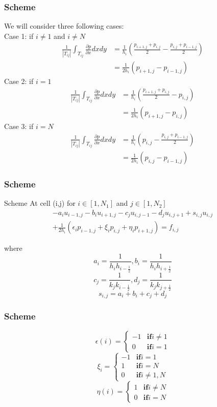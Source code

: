 \documentclass[11pt]{beamer}
\numberwithin{equation}{section}
\theoremstyle{plain}
\theoremstyle{definition}
\theoremstyle{remark}
\begin{document}
\begin{frame}\frametitle{Scheme}
We will consider three following cases: \\
Case 1: if $i \neq 1 $ and $ i \neq N $
\begin{align*}
\frac{1}{|T_{ij}|}\int_{T_{ij}} \frac{\partial p}{\partial x}dxdy &= \frac{1}{h_{i}}\left(\frac{p_{i+1,j}+p_{i,j}}{2}-\frac{p_{i,j}+p_{i-1,j}}{2}\right) \\
& = \frac{1}{2h_{i}}(p_{i+1,j}-p_{i-1,j})
\end{align*} 
Case 2: if $i = 1 $ 
\begin{align*}
\frac{1}{|T_{ij}|}\int_{T_{ij}} \frac{\partial p}{\partial x}dxdy &= \frac{1}{h_{i}}\left(\frac{p_{i+1,j}+p_{i,j}}{2}-p_{i,j}\right) \\
& = \frac{1}{2h_{i}}(p_{i+1,j}-p_{i,j})
\end{align*}
Case 3: if $i = N $
\begin{align*}
\frac{1}{|T_{ij}|}\int_{T_{ij}} \frac{\partial p}{\partial x}dxdy &= \frac{1}{h_{i}}\left(p_{i,j}-\frac{p_{i,j}+p_{i-1,j}}{2}\right) \\
& = \frac{1}{2h_{i}}(p_{i,j}-p_{i-1,j})
\end{align*}
\end{frame}
\begin{frame} \frametitle{Scheme}
\begin{block}{Scheme}
At cell (i,j) for $i \in [1,N_1]$ and $j\in [1,N_2]$
\begin{align*}
-a_iu_{i-1,j}-b_iu_{i+1,j}-c_ju_{i,j-1}-d_ju_{i,j+1}+s_{i,j}u_{i,j} \\ 
+\frac{1}{2h_{i}} (\epsilon_{i}p_{i-1,j} + \xi_{i}p_{i,j} + \eta_{i}p_{i+1,j})
 =f_{i,j}
\end{align*} 
\end{block}
where 
$$a_i=\frac{1}{h_ih_{i-\frac{1}{2}}},b_i=\frac{1}{h_ih_{i+\frac{1}{2}}}$$
$$c_j=\frac{1}{k_jk_{i-\frac{1}{2}}},d_j=\frac{1}{k_jk_{j+\frac{1}{2}}}$$
$$s_{i,j}=a_i+b_i+c_j+d_j$$
\end{frame}

\begin{frame}\frametitle{Scheme}
$$\epsilon(i)=\begin{cases}
-1 & \textbf{if} i \neq 1 \\
0 & \textbf{if}  i = 1
\end{cases}$$
$$\xi_{i}=\begin{cases}
-1 & \textbf{if} i = 1 \\
1 & \textbf{if}  i = N \\
0 & \textbf{if} i \neq 1,N
\end{cases}$$
$$\eta(i)=\begin{cases}
1 & \textbf{if} i \neq N \\
0 & \textbf{if}  i = N
\end{cases}$$
\end{frame}
\end{document}
